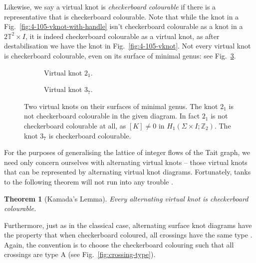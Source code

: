 \documentclass[12pt]{report}
\newcommand{\Z}{\mathbb{Z}}
\newcommand{\T}{\mathbb{T}}
\newtheorem*{theorem}{Theorem}
\begin{document}
Likewise, we say a virtual knot is \textit{checkerboard colourable} if there is a representative that is checkerboard colourable. Note that while the knot in a Fig.~\ref{fig:4-105-vknot-with-handle} isn't checkerboard colourable as a knot in a $2\T^{2} \times I$, it is indeed checkerboard colourable as a virtual knot, as after destabilisation we have the knot in Fig.~\ref{fig:4-105-vknot}. Not every virtual knot is checkerboard colourable, even on its surface of minimal genus: see Fig.~\ref{fig:cc-of-vknots}.

\begin{figure}[hbt!]
	\hspace*{\fill}
	\begin{subfigure}[b]{0.45 \textwidth}
		\centering
		\def\svgscale{0.35}
		
		\caption{Virtual knot $2_{1}$.}
		\label{fig:non-cc-vknot}
	\end{subfigure}
	\hspace*{\fill}
	\begin{subfigure}[b]{0.45 \textwidth}
		\centering
		\def\svgscale{0.35}
		
		\caption{Virtual knot $3_{7}$.}
		\label{fig:cc-vknot}
	\end{subfigure}
	\hspace*{\fill}
	\caption{Two virtual knots on their surfaces of minimal genus. The knot $2_{1}$ is not checkerboard colourable in the given diagram. In fact $2_{1}$ is not checkerboard colourable at all, as $[K] \neq 0$ in $H_{1}(\Sigma \times I; \Z_{2})$. The knot $3_{7}$ is checkerboard colourable.}
	\label{fig:cc-of-vknots}
\end{figure}

For the purposes of generalising the lattice of integer flows of the Tait graph, we need only concern ourselves with alternating virtual knots -- those virtual knots that can be represented by alternating virtual knot diagrams. Fortunately, tanks to the following theorem will not run into any trouble \cite[Lemma 7]{jones-polynomial-checkerboard-colourable}.

\begin{theorem}[Kamada's Lemma]
	Every alternating virtual knot is checkerboard colourable.
\end{theorem}

Furthermore, just as in the classical case, alternating surface knot diagrams have the property that when checkerboard coloured, all crossings have the same type \cite[Lemma 6]{alternating-links-thickened-surfaces}. Again, the convention is to choose the checkerboard colouring such that all crossings are type A (see Fig.~\ref{fig:crossing-type}).
\end{document}
